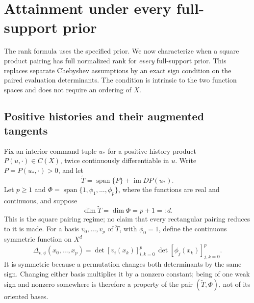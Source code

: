 \documentclass[11pt]{amsart}
\theoremstyle{definition}\newtheorem{definition}[theorem]{Definition}
\theoremstyle{remark}\newtheorem{remark}[theorem]{Remark}
\begin{document}
\section{Attainment under every full-support prior}
\label{sec:v18-universal}
The rank formula uses the specified prior. We now characterize when a
square product pairing has full normalized rank for \emph{every}
full-support prior. This replaces separate Chebyshev assumptions by an
exact sign condition on the paired evaluation determinants. The condition
is intrinsic to the two function spaces and does not require an ordering
of $X$.

\subsection{Positive histories and their augmented tangents}
Fix an interior command tuple $u_*$ for a positive history product
$P(u,\cdot)\in C(X)$, twice continuously differentiable in $u$. Write
$P=P(u_*,\cdot)>0$, and let
\begin{equation}\label{eq:v18-augmented-tangent}
 \widetilde T=\operatorname{span}\{P\}+\operatorname{im}DP(u_*).
\end{equation}
Let $p\ge1$ and $\Phi=\operatorname{span}\{1,\phi_1,\ldots,\phi_p\}$, where the
functions are real and continuous, and suppose
\begin{equation}\label{eq:v18-square-pair}
 \dim\widetilde T=\dim\Phi=p+1=:d.
\end{equation}
This is the square pairing regime; no claim that every rectangular
pairing reduces to it is made. For a basis $v_0,\ldots,v_p$ of
$\widetilde T$, with $\phi_0=1$, define the continuous symmetric
function on $X^d$
\begin{equation}\label{eq:v18-sign-kernel}
 \Delta_{v,\phi}(x_0,\ldots,x_p)
 =\det[v_i(x_k)]_{i,k=0}^p\,
  \det[\phi_j(x_k)]_{j,k=0}^p.
\end{equation}
It is symmetric because a permutation changes both determinants by the
same sign. Changing either basis multiplies it by a nonzero constant;
being of one weak sign and nonzero somewhere is therefore a property of
the pair $(\widetilde T,\Phi)$, not of its oriented bases.
\end{document}
